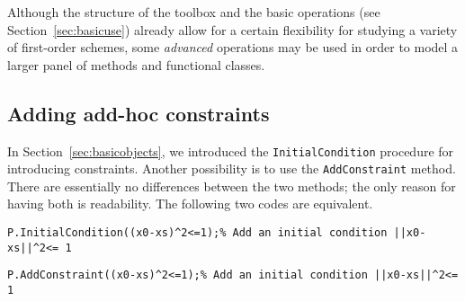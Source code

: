 \documentclass[11pt,a4paper]{article}
\begin{document}
Although the structure of the toolbox and the basic operations (see Section~\ref{sec:basicuse}) already allow for a certain flexibility for studying a variety of first-order schemes, some \emph{advanced} operations may be used in order to model a larger panel of methods and functional classes.

\subsection{Adding add-hoc constraints}\label{sec:constraints}
In Section~\ref{sec:basicobjects}, we introduced the \verb?InitialCondition? procedure for introducing constraints. Another possibility is to use the \verb?AddConstraint? method. There are essentially no differences between the two methods; the only reason for having both is readability. The following two codes are equivalent.\\[-1cm]
\begin{lstlisting}
P.InitialCondition((x0-xs)^2<=1);% Add an initial condition ||x0-xs||^2<= 1
\end{lstlisting}\vspace{-.5cm}
\begin{lstlisting}
P.AddConstraint((x0-xs)^2<=1);% Add an initial condition ||x0-xs||^2<= 1
\end{lstlisting}
\end{document}
